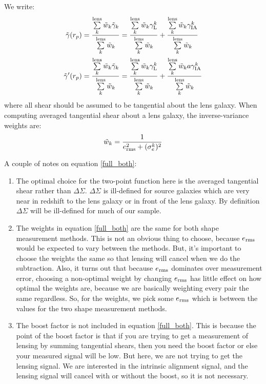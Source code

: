 \documentclass[onecolumn,amsmath,aps,fleqn, superscriptaddress]{revtex4}
\begin{document}
We write:
\begin{align}
\tilde{\gamma}(r_p) &= \frac{\sum\limits_{k}^{\rm lens} \tilde{w}_k \tilde{\gamma}_k}{\sum\limits_{k}^{\rm lens} \tilde{w}_k} = \frac{\sum\limits_{k}^{\rm lens} \tilde{w}_k \gamma_{\rm L}^k}{\sum\limits_{k}^{\rm lens} \tilde{w}_k}+\frac{\sum\limits_{k}^{\rm lens} \tilde{w}_k \gamma_{\rm IA}^k}{\sum\limits_{k}^{\rm lens} \tilde{w}_k} \nonumber \\ 
\tilde{\gamma}'(r_p) &= \frac{\sum\limits_{k}^{\rm lens} \tilde{w}_k \tilde{\gamma}_k}{\sum\limits_{k}^{\rm lens} \tilde{w}_k} = \frac{\sum\limits_{k}^{\rm lens} \tilde{w}_k \gamma_{\rm L}^k}{\sum\limits_{k}^{\rm lens} \tilde{w}_k}+\frac{\sum\limits_{k}^{\rm lens} \tilde{w}_k a \gamma_{\rm IA}^k}{\sum\limits_{k}^{\rm lens} \tilde{w}_k} 
\label{full_both}
\end{align}
where all shear should be assumed to be tangential about the lens galaxy. When computing averaged tangential shear about a lens galaxy, the inverse-variance weights are:
\begin{equation}
\tilde{w}_k = \frac{1}{e_{\rm rms}^2 + (\sigma_e^k)^2}
\label{weights}
\end{equation}

A couple of notes on equation \ref{full_both}:
\begin{enumerate}
\item{The optimal choice for the two-point function here is the averaged tangential shear rather than $\Delta \Sigma$. $\Delta \Sigma$ is ill-defined for source galaxies which are very near in redshift to the lens galaxy or in front of the lens galaxy. By definition $\Delta \Sigma$ will be ill-defined for much of our sample.}
\item{The weights in equation \ref{full_both} are the same for both shape measurement methods. This is not an obvious thing to choose, because $e_{\rm rms}$ would be expected to vary between the methods. But, it's important to choose the weights the same so that lensing will cancel when we do the subtraction. Also, it turns out that because $e_{\rm rms}$ dominates over measurement error, choosing a non-optimal weight by changing $e_{\rm rms}$ has little effect on how optimal the weights are, because we are basically weighting every pair the same regardless. So, for the weights, we pick some $e_{\rm rms}$ which is between the values for the two shape measurement methods.}
\item{The boost factor is not included in equation \ref{full_both}. This is because the point of the boost factor is that if you are trying to get a measurement of lensing by summing tangential shears, then you need the boost factor or else your measured signal will be low. But here, we are not trying to get the lensing signal. We are interested in the intrinsic alignment signal, and the lensing signal will cancel with or without the boost, so it is not necessary.}
\end{enumerate}
\end{document}
